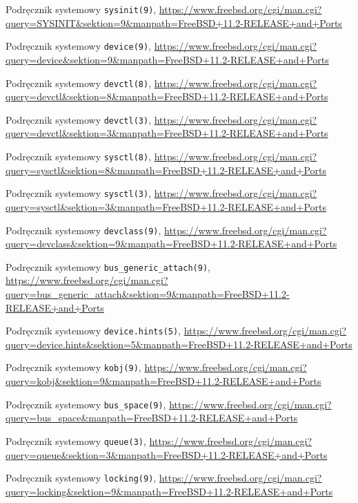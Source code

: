 \documentclass[shortabstract,inz]{iithesis}
\begin{document}
\begin{thebibliography}{1}
 Podręcznik systemowy \texttt{sysinit(9)},
\url{https://www.freebsd.org/cgi/man.cgi?query=SYSINIT&sektion=9&manpath=FreeBSD+11.2-RELEASE+and+Ports}

 Podręcznik systemowy \texttt{device(9)},
\url{https://www.freebsd.org/cgi/man.cgi?query=device&sektion=9&manpath=FreeBSD+11.2-RELEASE+and+Ports}

 Podręcznik systemowy \texttt{devctl(8)},
\url{https://www.freebsd.org/cgi/man.cgi?query=devctl&sektion=8&manpath=FreeBSD+11.2-RELEASE+and+Ports}

 Podręcznik systemowy \texttt{devctl(3)},
\url{https://www.freebsd.org/cgi/man.cgi?query=devctl&sektion=3&manpath=FreeBSD+11.2-RELEASE+and+Ports}

 Podręcznik systemowy \texttt{sysctl(8)},
\url{https://www.freebsd.org/cgi/man.cgi?query=sysctl&sektion=8&manpath=FreeBSD+11.2-RELEASE+and+Ports}

 Podręcznik systemowy \texttt{sysctl(3)},
\url{https://www.freebsd.org/cgi/man.cgi?query=sysctl&sektion=3&manpath=FreeBSD+11.2-RELEASE+and+Ports}

 Podręcznik systemowy \texttt{devclass(9)},
\url{https://www.freebsd.org/cgi/man.cgi?query=devclass&sektion=9&manpath=FreeBSD+11.2-RELEASE+and+Ports}

 Podręcznik systemowy \texttt{bus\_generic\_attach(9)},
\url{https://www.freebsd.org/cgi/man.cgi?query=bus_generic_attach&sektion=9&manpath=FreeBSD+11.2-RELEASE+and+Ports}

 Podręcznik systemowy \texttt{device.hints(5)},
\url{https://www.freebsd.org/cgi/man.cgi?query=device.hints&sektion=5&manpath=FreeBSD+11.2-RELEASE+and+Ports}

 Podręcznik systemowy \texttt{kobj(9)},
\url{https://www.freebsd.org/cgi/man.cgi?query=kobj&sektion=9&manpath=FreeBSD+11.2-RELEASE+and+Ports}

 Podręcznik systemowy \texttt{bus\_space(9)},
\url{https://www.freebsd.org/cgi/man.cgi?query=bus_space&manpath=FreeBSD+11.2-RELEASE+and+Ports}

 Podręcznik systemowy \texttt{queue(3)},
\url{https://www.freebsd.org/cgi/man.cgi?query=queue&sektion=3&manpath=FreeBSD+11.2-RELEASE+and+Ports}

 Podręcznik systemowy \texttt{locking(9)},
\url{https://www.freebsd.org/cgi/man.cgi?query=locking&sektion=9&manpath=FreeBSD+11.2-RELEASE+and+Ports}


\end{thebibliography}
\end{document}
